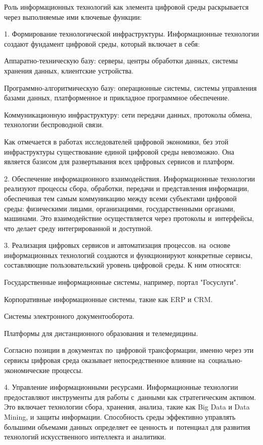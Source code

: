 \documentclass{ou}
\begin{document}
Роль информационных технологий как элемента цифровой среды раскрывается через выполняемые ими ключевые функции:

1.	Формирование технологической инфраструктуры. Информационные технологии создают фундамент цифровой среды, который включает в себя:

Аппаратно-техническую базу: серверы, центры обработки данных, системы хранения данных, клиентские устройства.

Программно-алгоритмическую базу: операционные системы, системы управления базами данных, платформенное и прикладное программное обеспечение.

Коммуникационную инфраструктуру: сети передачи данных, протоколы обмена, технологии беспроводной связи.

Как отмечается в работах исследователей цифровой экономики, без этой     инфраструктуры существование единой цифровой среды невозможно. Она является базисом для развертывания всех цифровых сервисов и платформ.

2.	Обеспечение информационного взаимодействия. Информационные технологии реализуют процессы сбора, обработки, передачи и представления информации, обеспечивая тем самым коммуникацию между всеми субъектами цифровой среды: физическими лицами, организациями, государственными органами, машинами. Это взаимодействие осуществляется через протоколы и~интерфейсы, что делает среду интегрированной и доступной.

3.	Реализация цифровых сервисов и автоматизация процессов. на~основе информационных технологий создаются и функционируют конкретные сервисы, составляющие пользовательский уровень цифровой среды. К ним относятся:

Государственные информационные системы, например, портал "Госуслуги".

Корпоративные информационные системы, такие как ERP и CRM.

Системы электронного документооборота.

Платформы для дистанционного образования и телемедицины.

Согласно позиции в документах по~цифровой трансформации, именно через эти сервисы цифровая среда оказывает непосредственное влияние на~социально-экономические процессы.

4.	Управление информационными ресурсами. Информационные технологии предоставляют инструменты для работы с~данными как стратегическим активом. Это включает технологии сбора, хранения, анализа, такие как Big Data и Data Mining, и защиты информации. Способность среды эффективно управлять большими объемами данных определяет ее ценность и~потенциал для развития технологий искусственного интеллекта и аналитики.
\end{document}
